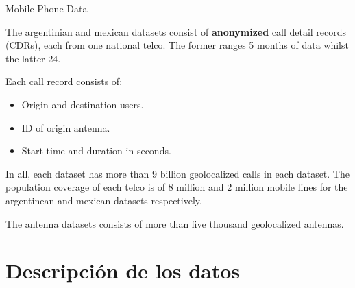 \documentclass{beamer}
\begin{document}
\begin{frame}{Mobile Phone Data}


The argentinian and mexican datasets consist of \textbf{anonymized} call detail records (CDRs), each from one national telco. The former ranges 5 months of data whilst the latter 24.


\medskip
Each call record consists of:
\begin{itemize}
	\item Origin and destination users.
	\item ID of origin antenna.
	\item Start time and duration in seconds.
\end{itemize}

\medskip
In all, each dataset has more than 9 billion geolocalized calls in each dataset. The population coverage of each telco is of 8 million and 2 million mobile lines for the argentinean and mexican datasets respectively.

\medskip
The antenna datasets consists of more than five thousand geolocalized antennas.

\end{frame}

\section{ Descripción de los datos}
\end{document}
